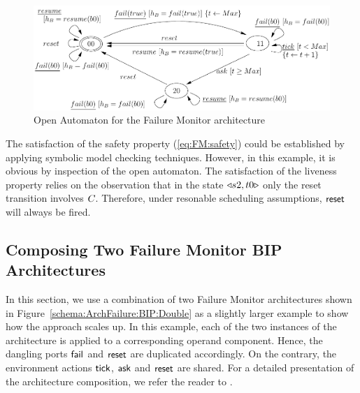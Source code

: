 \documentclass[smallcondensed]{svjour3}
\newcommand{\OTvar}{\texttt}
\newcommand{\ie}[1][\ ]{i.e.#1}
\begin{document}
\begin{figure}[t]
  \centerline{\includegraphics[width=12cm]{ActaXFIG/FailureTimerOA-v2-2}}
  \caption{Open Automaton for the Failure Monitor architecture}
  \label{schema:resultOA1}
\end{figure}

%

The satisfaction of the safety property (\ref{eq:FM:safety}) could be
established by applying symbolic model checking techniques.  However,
in this example, it is obvious by inspection of the open automaton.
The satisfaction of the liveness property relies on the observation
that in the state $\triangleleft{s2,t0}\triangleright$ only the reset transition involves
$C_{}$.  Therefore, under resonable scheduling assumptions,
$\mathsf{reset}$ will always be fired.

\subsection{Composing Two Failure Monitor BIP Architectures}
\label{section:use-case:Double}

In this section, we use a combination of two Failure Monitor
architectures shown in Figure~\ref{schema:ArchFailure:BIP:Double}
as a slightly larger example to show how the approach scales up.  In
this example, each of the two instances of the architecture is applied
to a corresponding operand component.  Hence, the dangling ports
$\mathsf{fail}_{}$ and $\mathsf{reset}$ are duplicated accordingly.  On the
contrary, the environment actions $\mathsf{tick}$, $\mathsf{ask}$ and
$\mathsf{reset}$ are shared.  For a detailed presentation of the
architecture composition, we refer the reader to
\cite{AttieBBJS16-architectures-faoc}.
\end{document}
